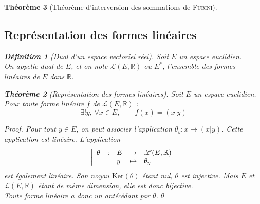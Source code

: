\documentclass[11pt,a4paper]{report}
\newtheorem{theorem}{Théorème}[chapter]
\theoremstyle{definition}
\newtheorem{dfn}[theorem]{Définition}
\begin{document}
\begin{theorem}[Théorème d'interversion des sommations de \textsc{Fubini}]
{{%
\subsection{Représentation des formes linéaires} %
\label{sub:representation_des_formes_lineaires}
\begin{dfn}[Dual d'un espace vectoriel réel] %
     Soit $E$ un espace euclidien. \\
     On appelle \emph{dual} de $E$, et on note $\mathscr{L}(E,\ensuremath{\mathbb{R}} )$ ou $E^*$, l'ensemble des formes linéaires de $E$ dans $\ensuremath{\mathbb{R}}$.
\end{dfn}
\begin{theorem}[Représentation des formes linéaires]
     Soit $E$ un espace euclidien.\\
     Pour toute forme linéaire $f$ de $\mathscr{L}(E,\ensuremath{\mathbb{R}} )$ : 
     \begin{equation}
     \exists ! y,\, \forall x\in E,\qquad f(x) = (x|y)
     \end{equation}
\end{theorem}
\begin{proof}
     Pour tout $y \in E$, on peut associer l'application $\theta_y : x\mapsto (x|y)$. Cette application est linéaire. L'application \[ \left| \begin{array}{r c l c l} \theta &:& E &\to & \mathscr{L}(E,\ensuremath{\mathbb{R}})\\ && y &\mapsto& \theta_y \end{array}\right.\] est également linéaire. Son noyau $\mathrm{Ker}(\theta )$ étant nul, $\theta$ est injective. Mais $E$ et $\mathscr{L}(E,\ensuremath{\mathbb{R}})$ étant de même dimension, elle est donc \emph{bijective}.\\
     Toute forme linéaire a donc un antécédant par $\theta$.\qed
\end{proof}

}}
\end{theorem}
\end{document}
